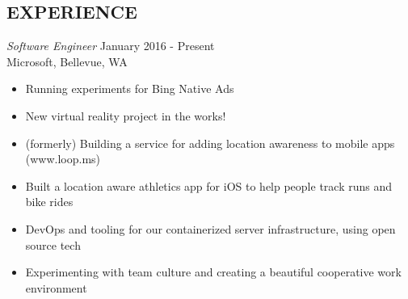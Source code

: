 \documentclass[margin,4pt]{res} %
\begin{document}

\address{
virajosinha at gmail\\
408 505 1275
}


\address{
vsinha.com \\
github.com/vsinha
}





\begin{resume}



 
\section{EXPERIENCE} 
	{\sl Software Engineer} \hfill January 2016 - Present\\
		Microsoft, Bellevue, WA
		\begin{itemize} \itemsep -2pt
		\item Running experiments for Bing Native Ads
		\item New virtual reality project in the works!
		\item (formerly) Building a service for adding location awareness to mobile apps (www.loop.ms)
		\item Built a location aware athletics app for iOS to help people track runs and bike rides
		\item DevOps and tooling for our containerized server infrastructure, using open source tech
		\item Experimenting with team culture and creating a beautiful cooperative work environment
		\end{itemize}


\end{resume}
\end{document}
